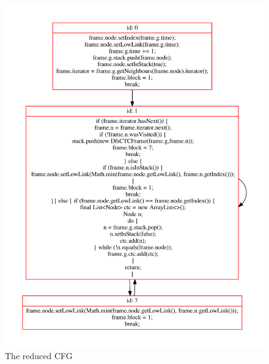 \begin{figure}[htb]
    \centering
    \includegraphics[width=.5\textwidth]{src/graph/inline-after-1.pdf}
    \caption{The reduced CFG\label{img:inline1}}
\end{figure}